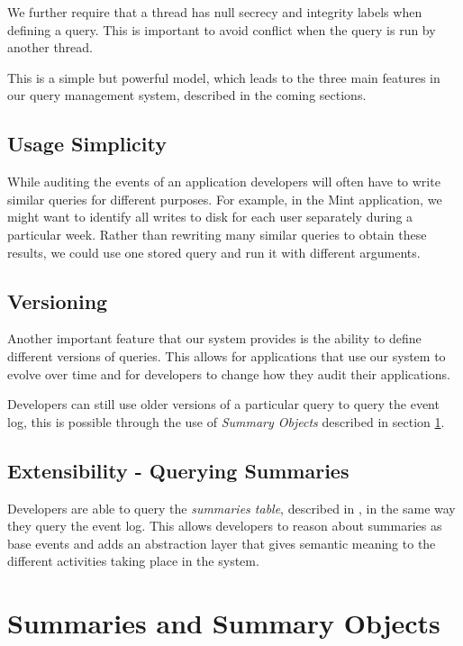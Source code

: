 We further require that a thread has null secrecy and integrity labels when defining a query. This is important to avoid conflict when the query is run by another thread. 

This is a simple but powerful model, which leads to the three main features in our query management system, described in the coming sections.

\subsection{Usage Simplicity}

While auditing the events of an application developers will often have to write similar queries for different purposes. For example, in the Mint application, we might want to identify all writes to disk for each user separately during a particular week. Rather than rewriting many similar queries to obtain these results, we could use one stored query and run it with different arguments.

\subsection{Versioning}

Another important feature that our system provides is the ability to define different versions of queries. This allows for applications that use our system to evolve over time and for developers to change how they audit their applications.

Developers can still use older versions of a particular query to query the event log, this is possible through the use of \emph{Summary Objects} described in section \ref{summary_objects}.

\subsection{Extensibility - Querying Summaries}

Developers are able to query the \emph{summaries table}, described in , in the same way they query the event log. This allows developers to reason about summaries as base events and adds an abstraction layer that gives semantic meaning to the different activities taking place in the system.

\section{Summaries and Summary Objects}\label{summary_objects}

